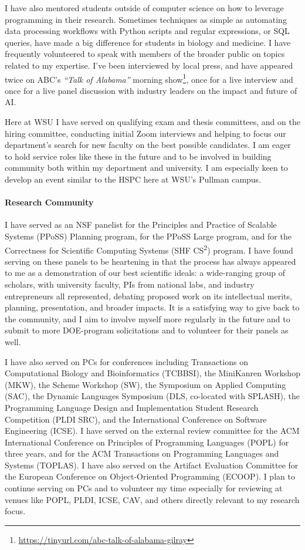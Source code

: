 \documentclass[12pt]{article}
\begin{document}
I have also mentored students outside of computer science on how to leverage programming in their research. Sometimes techniques as simple as automating data processing workflows with Python scripts and regular expressions, or SQL queries, have made a big difference for students in biology and medicine. I have frequently volunteered to speak with members of the broader public on topics related to my expertise. I've been interviewed by local press, and have appeared twice on ABC's \emph{``Talk of Alabama''} morning show\footnote{\url{https://tinyurl.com/abc-talk-of-alabama-gilray}}, once for a live interview and once for a live panel discussion with industry leaders on the impact and future of AI. 

Here at WSU I have served on qualifying exam and thesis committees, and on the hiring committee, conducting initial Zoom interviews and helping to focus our department's search for new faculty on the best possible candidates.
I am eager to hold service roles like these in the future and to be involved in building community both within my department and university. I am especially keen to develop an event similar to the HSPC here at WSU's Pullman campus.


\paragraph*{Research Community}
I have served as an NSF panelist for the Principles and Practice of Scalable Systems (PPoSS) Planning program, for the PPoSS Large program, and for the Correctness for Scientific Computing Systems (SHF CS\textsuperscript{2}) program. I have found serving on these panels to be heartening in that the process has always appeared to me as a demonstration of our best scientific ideals: a wide-ranging group of scholars, with university faculty, PIs from national labs, and industry entrepreneurs all represented, debating proposed work on its intellectual merits, planning, presentation, and broader impacts. It is a satisfying way to give back to the community, and I aim to involve myself more regularly in the future and to submit to more DOE-program solicitations and to volunteer for their panels as well.

I have also served on PCs for conferences including Transactions on Computational Biology and Bioinformatics (TCBBSI), the MiniKanren Workshop (MKW), the Scheme Workshop (SW), the Symposium on Applied Computing (SAC), the Dynamic Languages Symposium (DLS, co-located with SPLASH), the Programming Language Design and Implementation Student Research Competition (PLDI SRC), and the International Conference on Software Engineering (ICSE). I have served on the external review committee for the ACM International Conference on Principles of Programming Languages (POPL) for three years, and for the ACM Transactions on Programming Languages and Systems (TOPLAS). I have also served on the Artifact Evaluation Committee for the European Conference on Object-Oriented Programming (ECOOP). I plan to continue serving on PCs and to volunteer my time especially for reviewing at venues like POPL, PLDI, ICSE, CAV, and others directly relevant to my research focus.
\end{document}

